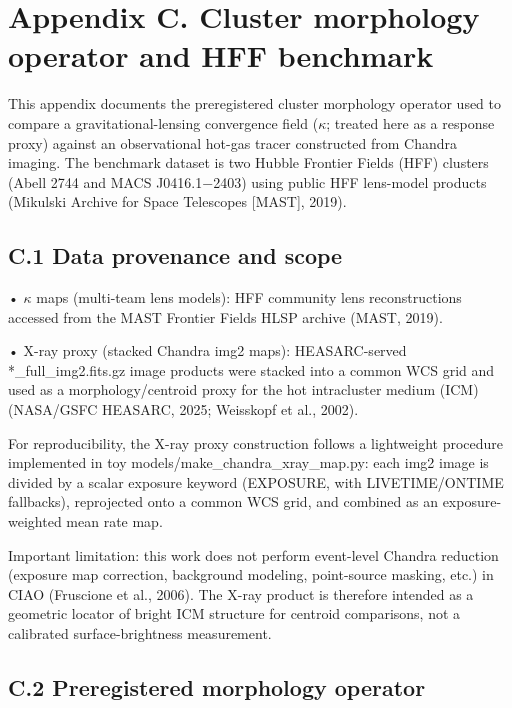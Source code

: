 \section{}\label{section-12}

\section{Appendix C. Cluster morphology operator and HFF benchmark}\label{appendix-c.-cluster-morphology-operator-and-hff-benchmark}

This appendix documents the preregistered cluster morphology operator used to compare a gravitational-lensing convergence field (\(\kappa\); treated here as a response proxy) against an observational hot-gas tracer constructed from Chandra imaging. The benchmark dataset is two Hubble Frontier Fields (HFF) clusters (Abell 2744 and MACS J0416.1−2403) using public HFF lens-model products (Mikulski Archive for Space Telescopes {[}MAST{]}, 2019).

\subsection{C.1 Data provenance and scope}\label{c.1-data-provenance-and-scope}

• \(\kappa\) maps (multi-team lens models): HFF community lens reconstructions accessed from the MAST Frontier Fields HLSP archive (MAST, 2019).

• X-ray proxy (stacked Chandra img2 maps): HEASARC-served *\_full\_img2.fits.gz image products were stacked into a common WCS grid and used as a morphology/centroid proxy for the hot intracluster medium (ICM) (NASA/GSFC HEASARC, 2025; Weisskopf et al., 2002).

For reproducibility, the X-ray proxy construction follows a lightweight procedure implemented in toy models/make\_chandra\_xray\_map.py: each img2 image is divided by a scalar exposure keyword (EXPOSURE, with LIVETIME/ONTIME fallbacks), reprojected onto a common WCS grid, and combined as an exposure-weighted mean rate map.

Important limitation: this work does not perform event-level Chandra reduction (exposure map correction, background modeling, point-source masking, etc.) in CIAO (Fruscione et al., 2006). The X-ray product is therefore intended as a geometric locator of bright ICM structure for centroid comparisons, not a calibrated surface-brightness measurement.

\subsection{C.2 Preregistered morphology operator}\label{c.2-preregistered-morphology-operator}

